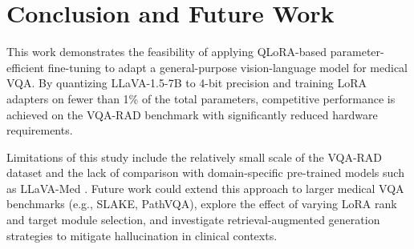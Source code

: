 \section{Conclusion and Future Work}
\label{sec:conclusion}

This work demonstrates the feasibility of applying QLoRA-based parameter-efficient fine-tuning to adapt a general-purpose vision-language model for medical VQA. By quantizing LLaVA-1.5-7B to 4-bit precision and training LoRA adapters on fewer than 1\% of the total parameters, competitive performance is achieved on the VQA-RAD benchmark with significantly reduced hardware requirements.

Limitations of this study include the relatively small scale of the VQA-RAD dataset and the lack of comparison with domain-specific pre-trained models such as LLaVA-Med \cite{li2023llavamed}. Future work could extend this approach to larger medical VQA benchmarks (e.g., SLAKE, PathVQA), explore the effect of varying LoRA rank and target module selection, and investigate retrieval-augmented generation strategies to mitigate hallucination in clinical contexts.
